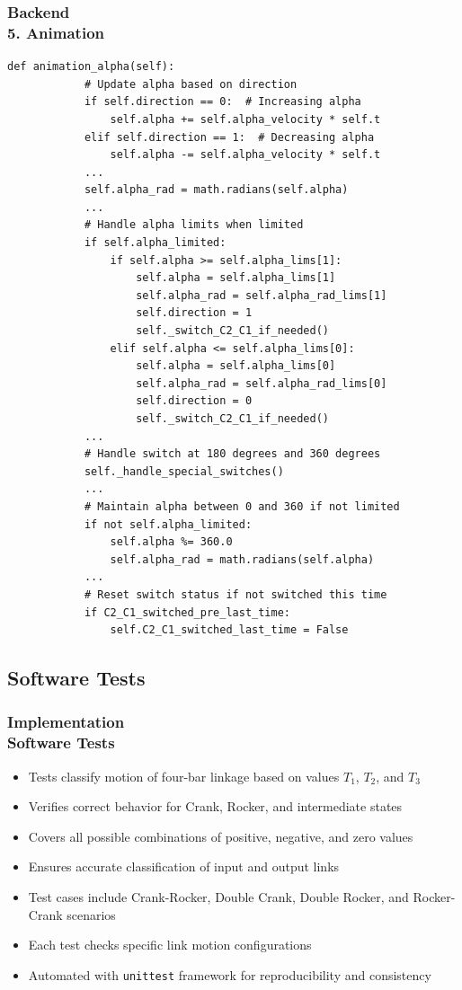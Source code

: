 \documentclass[ucs,10pt]{beamer}
\begin{document}
\begin{frame}[fragile]
\frametitle{Backend \\
	\small \color{rwth-blue} 5. Animation}
	\begin{lstlisting}[basicstyle=\ssmall]
		def animation_alpha(self):
			# Update alpha based on direction
			if self.direction == 0:  # Increasing alpha
				self.alpha += self.alpha_velocity * self.t
			elif self.direction == 1:  # Decreasing alpha
				self.alpha -= self.alpha_velocity * self.t
			...
			self.alpha_rad = math.radians(self.alpha)
			...
			# Handle alpha limits when limited
			if self.alpha_limited:
				if self.alpha >= self.alpha_lims[1]:
					self.alpha = self.alpha_lims[1]
					self.alpha_rad = self.alpha_rad_lims[1]
					self.direction = 1
					self._switch_C2_C1_if_needed()
				elif self.alpha <= self.alpha_lims[0]:
					self.alpha = self.alpha_lims[0]
					self.alpha_rad = self.alpha_rad_lims[0]
					self.direction = 0
					self._switch_C2_C1_if_needed()
			...
			# Handle switch at 180 degrees and 360 degrees
			self._handle_special_switches()
			...
			# Maintain alpha between 0 and 360 if not limited
			if not self.alpha_limited:
				self.alpha %= 360.0
				self.alpha_rad = math.radians(self.alpha)
			...
			# Reset switch status if not switched this time
			if C2_C1_switched_pre_last_time:
				self.C2_C1_switched_last_time = False
	\end{lstlisting}
\end{frame}

\subsection{Software Tests}

\begin{frame}
    \frametitle{Implementation \\
    \small \color{rwth-blue} Software Tests}
    
    \begin{itemize}
        \item Tests classify motion of four-bar linkage based on values \( T_1 \), \( T_2 \), and \( T_3 \)
        \item Verifies correct behavior for Crank, Rocker, and intermediate states
        \item Covers all possible combinations of positive, negative, and zero values
        \item Ensures accurate classification of input and output links
        \item Test cases include Crank-Rocker, Double Crank, Double Rocker, and Rocker-Crank scenarios
        \item Each test checks specific link motion configurations
        \item Automated with \texttt{unittest} framework for reproducibility and consistency
    \end{itemize}
    
\end{frame}
\end{document}
